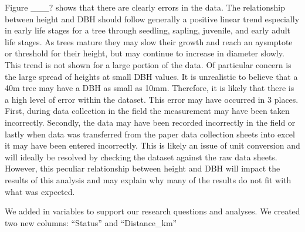 \documentclass[
  12pt,
]{article}
\begin{document}
Figure \_\_\_? shows that there are clearly errors in the data. The
relationship between height and DBH should follow generally a positive
linear trend especially in early life stages for a tree through
seedling, sapling, juvenile, and early adult life stages. As trees
mature they may slow their growth and reach an aysmptote or threshold
for their height, but may continue to increase in diameter slowly. This
trend is not shown for a large portion of the data. Of particular
concern is the large spread of heights at small DBH values. It is
unrealistic to believe that a 40m tree may have a DBH as small as 10mm.
Therefore, it is likely that there is a high level of error within the
dataset. This error may have occurred in 3 places. First, during data
collection in the field the measurement may have been taken incorrectly.
Secondly, the data may have been recorded incorrectly in the field or
lastly when data was transferred from the paper data collection sheets
into excel it may have been entered incorrectly. This is likely an issue
of unit conversion and will ideally be resolved by checking the dataset
against the raw data sheets. However, this peculiar relationship between
height and DBH will impact the results of this analysis and may explain
why many of the results do not fit with what was expected.

We added in variables to support our research questions and analyses. We
created two new columns: ``Status'' and ``Distance\_km''
\end{document}
